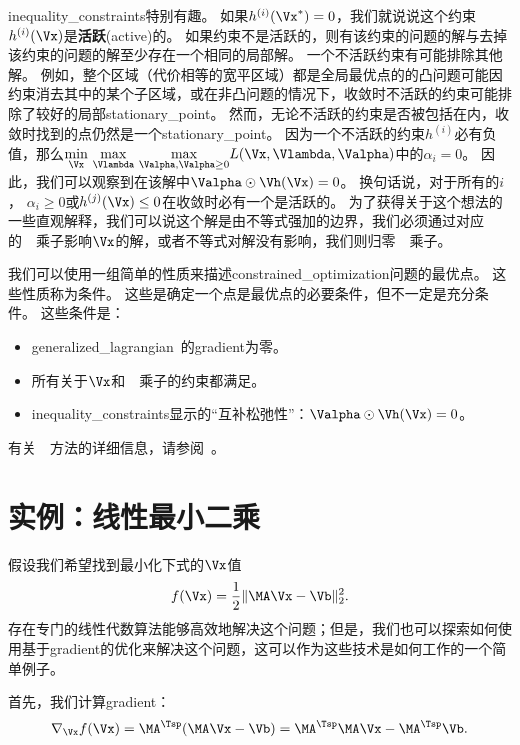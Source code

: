 \gls{inequality_constraints}特别有趣。
如果$h^{(i)}(\Vx^*)= 0$，我们就说说这个约束$h^{(i)}(\Vx)$是\textbf{活跃}(active)的。
如果约束不是活跃的，则有该约束的问题的解与去掉该约束的问题的解至少存在一个相同的局部解。
一个不活跃约束有可能排除其他解。
例如，整个区域（代价相等的宽平区域）都是全局最优点的的凸问题可能因约束消去其中的某个子区域，或在非凸问题的情况下，收敛时不活跃的约束可能排除了较好的局部\gls{stationary_point}。
然而，无论不活跃的约束是否被包括在内，收敛时找到的点仍然是一个\gls{stationary_point}。
因为一个不活跃的约束$h^{(i)}$必有负值，那么$
 \underset{\Vx}{\min}~  \underset{\Vlambda}{\max}~
 \underset{\Valpha, \Valpha \geq 0}{\max}   L(\Vx, \Vlambda, \Valpha) 
$中的$\alpha_i = 0$。
因此，我们可以观察到在该解中$\Valpha \odot \Vh(\Vx) = 0$。
换句话说，对于所有的$i$， $\alpha_i \geq 0$或$ h^{(j)}(\Vx) \leq 0$在收敛时必有一个是活跃的。
为了获得关于这个想法的一些直观解释，我们可以说这个解是由不等式强加的边界，我们必须通过对应的~~乘子影响$\Vx$的解，或者不等式对解没有影响，我们则归零~~乘子。

我们可以使用一组简单的性质来描述\gls{constrained_optimization}问题的最优点。
这些性质称为条件\citep{Karush39,kuhn1951}。
这些是确定一个点是最优点的必要条件，但不一定是充分条件。
这些条件是：
\begin{itemize}
 \item \gls{generalized_lagrangian}~的\gls{gradient}为零。
 \item 所有关于$\Vx$和~~乘子的约束都满足。
 \item \gls{inequality_constraints}显示的``互补松弛性''：$\Valpha \odot \Vh(\Vx) = 0$。
\end{itemize}
有关~~方法的详细信息，请参阅~\cite{NumOptBook}。


\section{实例：线性最小二乘}
\label{sec:example_linear_least_squares}
假设我们希望找到最小化下式的$\Vx$值
\begin{align}
 f(\Vx) = \frac{1}{2}\| \MA \Vx - \Vb \|_2^2 .
\end{align}
存在专门的线性代数算法能够高效地解决这个问题；但是，我们也可以探索如何使用基于\gls{gradient}的优化来解决这个问题，这可以作为这些技术是如何工作的一个简单例子。

首先，我们计算\gls{gradient}：
\begin{align}
 \nabla_{\Vx} f(\Vx) = \MA^\Tsp (\MA \Vx - \Vb) = \MA^\Tsp \MA \Vx - \MA^\Tsp \Vb .
\end{align}

